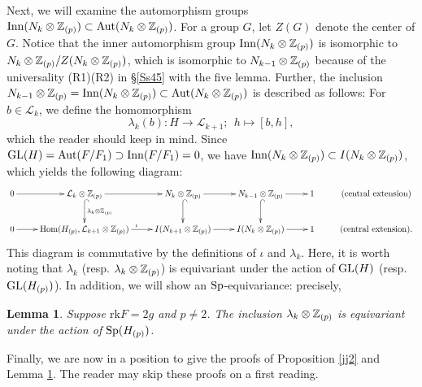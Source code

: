 \documentclass{article}
\theoremstyle{plain}
\newtheorem{lem}[thm]{Lemma}
\theoremstyle{definition}
\def\Hom{\mathop{\mathrm{Hom}}\nolimits}
\newcommand{\lra}{\longrightarrow}
\newcommand{\Z}{{\Bbb Z}}
\newcommand{\Aut}{{\rm Aut}}
\newcommand{\Sp}{{\rm Sp}}
\newcommand{\GL}{{\rm GL}}
\begin{document}
{Next, we will examine the automorphism groups $\mathrm{Inn} (N_k \otimes \Z_{(p)} ) \subset \Aut(N_k \otimes \Z_{(p)}) $. For a group $G$, let $ Z(G)$ denote the center of $G$. Notice that the inner automorphism group $\mathrm{Inn}(N_k \otimes \Z_{(p)}) $ is isomorphic to $ N_k \otimes \Z_{(p)} /Z(N_k \otimes \Z_{(p)})$, which is isomorphic to $N_{k-1} \otimes \Z_{(p)}$ because of the universality (R1)(R2) in \S \ref{Ss45} with the five lemma. Further, the inclusion $ N_{k-1} \otimes \Z_{(p)} =\mathrm{Inn}(N_k \otimes \Z_{(p)}) \subset \Aut(N_k \otimes \Z_{(p)}) $ is described as follows: For $ b \in \mathcal{L}_{ k}$, we define the homomorphism
\[\lambda_k (b) : H \lra \mathcal{L}_{k+1} ; \ \ h \longmapsto [b,h], \]
which the reader should keep in mind. Since $\GL(H) =\Aut(F/F_1) \supset \mathrm{Inn} (F/F_1)= 0 $, we have $\mathrm{Inn} (N_k \otimes \Z_{(p)} ) \subset I(N_k \otimes \Z_{(p)} ) $, which yields the following diagram:
\begin{equation}\label{seq48}
{\normalsize
\xymatrix{
0 \ar[r] & \mathcal{L}_{ k}\otimes \Z_{(p)} \ar[r] \ar@{^{(}->}[d]^{\lambda_k \otimes \Z_{(p)} } & N_{k} \otimes \Z_{(p)} \ar[r]
\ar@{^{(}->}[d]& N_{k-1} \otimes \Z_{(p)} \ar[r] \ar@{^{(}->}[d]& 1 &( \mathrm{central \ extension} )\\
 0 \ar[r] & \Hom ( H_{(p)} , \mathcal{L}_{k+1}\otimes \Z_{(p)}) \ar[r]^{ \ \ \iota }
& I(N_{k+1}\otimes \Z_{(p)}) \ar[r]& I(N_{k}\otimes \Z_{(p)}) \ar[r]& 1 & (\mathrm{central \ extension}) .%
}}
\end{equation}
This diagram is commutative by the definitions of $ \iota$ and $\lambda_k$. Here, it is worth noting that $\lambda_k $ (resp. $\lambda_k \otimes \Z_{(p)} $) is equivariant under the action of $ \GL(H )$ (resp. $ \GL(H_{(p)} )$). In addition, we will show an $\Sp$-equivariance: precisely,

\begin{lem}\label{ii92280}
Suppose $\mathrm{rk}F=2g$ and $p\neq 2$. The inclusion $\lambda_k \otimes \Z_{(p)} $ is equivariant under the action of $ \Sp(H_{(p)} )$.
\end{lem}

Finally, we are now in a position to give the proofs of Proposition \ref{jj2} and Lemma \ref{ii92280}. The reader may skip these proofs on a first reading.

}
\end{document}
